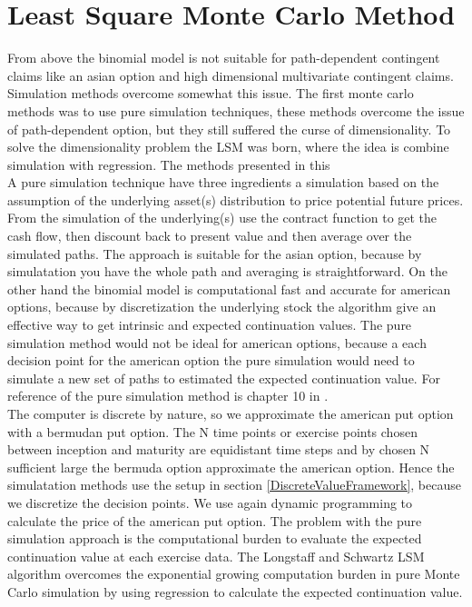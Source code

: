\newpage

\section{Least Square Monte Carlo Method}\label{LSM}
From above the binomial model is not suitable for path-dependent contingent claims like an asian option and high dimensional multivariate contingent claims. Simulation methods overcome somewhat this issue. The first monte carlo methods was to use pure simulation techniques, these methods overcome the issue of path-dependent option, but they still suffered the curse of dimensionality. To solve the dimensionality problem the LSM was born, where the idea is combine simulation with regression. The methods presented in this \\

A pure simulation technique have three ingredients a simulation based on the assumption of the underlying asset(s) distribution to price potential future prices. From the simulation of the underlying(s) use the contract function to get the cash flow, then discount back to present value and then average over the simulated paths. The approach is suitable for the asian option, because by simulatation you have the whole path and averaging is straightforward. On the other hand the binomial model is computational fast and accurate for american options, because by discretization the underlying stock the algorithm give an effective way to get intrinsic and expected continuation values. The pure simulation method would not be ideal for american options, because a each decision point for the american option the pure simulation would need to simulate a new set of paths to estimated the expected continuation value. For reference of the pure simulation method is chapter 10 in \parencite{OVERHAUSMARCUS2007EHD}.\\ 

The computer is discrete by nature, so we approximate the american put option with a bermudan put option. The N time points or exercise points chosen between inception and maturity are equidistant time steps and by chosen N sufficient large the bermuda option approximate the american option. Hence the simulatation methods use the setup in section \ref{DiscreteValueFramework}, because we discretize the decision points. We use again dynamic programming to calculate the price of the american put option. The problem with the pure simulation approach is the computational burden to evaluate the expected continuation value at each exercise data. The Longstaff and Schwartz LSM algorithm overcomes the exponential growing computation burden in pure Monte Carlo simulation by using regression to calculate the expected continuation value.

